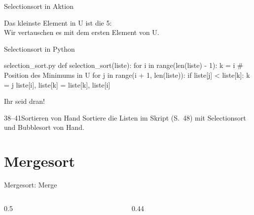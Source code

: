 \begin{frame}{Selectionsort in Aktion}
  \vspace{5mm}
  \vfill
  \begin{center}
    Das kleinste Element in U ist die 5:\\
    Wir vertauschen es mit dem ersten Element von U.
  \end{center}
\end{frame}

\begin{frame}[fragile]{Selectionsort in Python}
\begin{codebox}{selection\_sort.py}
def selection_sort(liste):
    for i in range(len(liste) - 1):
        k = i  # Position des Minimums in U
        for j in range(i + 1, len(liste)):
            if liste[j] < liste[k]:
                k = j
        liste[i], liste[k] = liste[k], liste[i]
\end{codebox}
\end{frame}

\begin{frame}[machmit={zu zweit · 15 Min}]{Ihr seid dran!}
  \vspace{2mm}
  \begin{task}{38–41}{Sortieren von Hand}
    Sortiere die Listen im Skript (S.~48) mit Selectionsort und Bubblesort
    von Hand.
  \end{task}
\end{frame}

\section{Mergesort}
\begin{frame}{Mergesort: Merge}
  \begin{columns}[T,onlytextwidth]
    \begin{column}{0.5\textwidth}
    \end{column}
    \begin{column}{0.44\textwidth}
      \vspace{1mm}
      \vspace{5mm}
    \end{column}
  \end{columns}
\end{frame}


